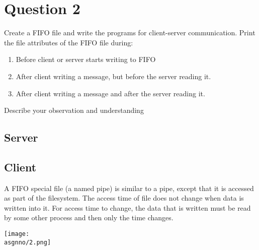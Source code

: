 \documentclass[main.tex]{subfiles}
\begin{document}
\section{Question 2}

Create a FIFO file and write the programs for client-server communication. Print
the file attributes of the FIFO file during:
\begin{enumerate}
\item Before client or server starts writing to FIFO
\item After client writing a message, but before the server reading it.
\item After client writing a message and after the server reading it.
\end{enumerate}
Describe your observation and understanding

\subsection{Server}

\subsection{Client}


A FIFO special file (a named pipe) is similar to a pipe, except that it is
accessed as part of the filesystem. The access time of file does not change when
data is written into it. For access time to change, the data that is written
must be read by some other process and then only the time changes.

\centering\texttt{[image: \\asgnno/2.png]}
\clearpage
\end{document}
